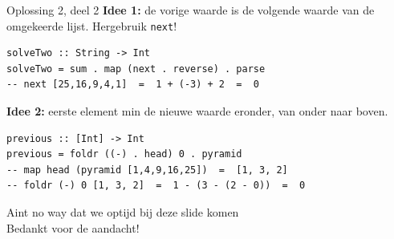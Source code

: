 \documentclass[aspectratio=169,11pt]{beamer}
\newcommand{\hs}{\lstinline[style=hsinline]}
\begin{document}
 \begin{frame}[fragile]{Oplossing 2, deel 2}
  \textbf{Idee 1:} de vorige waarde is de volgende waarde van de
  \alert{omgekeerde} lijst. Hergebruik \hs|next|!
\begin{lstlisting}
solveTwo :: String -> Int
solveTwo = sum . map (next . reverse) . parse
-- next [25,16,9,4,1]  =  1 + (-3) + 2  =  0
\end{lstlisting}
  \pause
  \textbf{Idee 2:} eerste element \alert{min} de nieuwe waarde eronder,
  van onder naar boven.
\begin{lstlisting}
previous :: [Int] -> Int
previous = foldr ((-) . head) 0 . pyramid
-- map head (pyramid [1,4,9,16,25])  =  [1, 3, 2]
-- foldr (-) 0 [1, 3, 2]  =  1 - (3 - (2 - 0))  =  0
\end{lstlisting}
\end{frame}

\begin{frame}[standout]
Aint no way dat we optijd bij deze slide komen\\
Bedankt voor de aandacht!
\end{frame}
\end{document}
